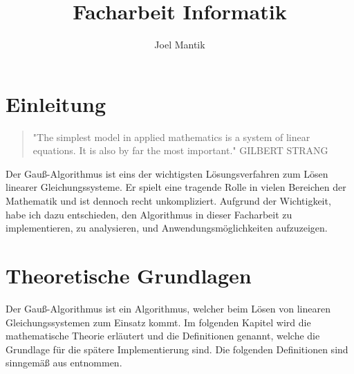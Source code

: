 \documentclass[a4paper, 12pt]{report}
\title{Facharbeit Informatik}
\author{Joel Mantik}
\begin{document}
\maketitle
\begin{sloppypar}
\tableofcontents

\chapter{Einleitung}
\begin{quote}
    "The simplest model in applied mathematics is a system of linear equations. It is also by far the most important."
    \newline GILBERT STRANG
\end{quote}
Der Gauß-Algorithmus ist eins der wichtigsten Lösungsverfahren zum Lösen linearer Gleichungssysteme.
Er spielt eine tragende Rolle in vielen Bereichen der Mathematik und ist dennoch  recht unkompliziert.
    Aufgrund der Wichtigkeit, habe ich dazu entschieden, den Algorithmus in dieser
Facharbeit zu implementieren,
zu analysieren, und Anwendungsmöglichkeiten aufzuzeigen.

\chapter{Theoretische Grundlagen}
Der Gauß-Algorithmus ist ein Algorithmus, welcher beim Lösen von linearen Gleichungssystemen zum Einsatz kommt. Im folgenden Kapitel wird die mathematische
Theorie erläutert und die Definitionen genannt, welche die Grundlage für die spätere Implementierung sind.
Die folgenden Definitionen sind sinngemäß aus \cite{1} entnommen.

\end{sloppypar}
\end{document}
